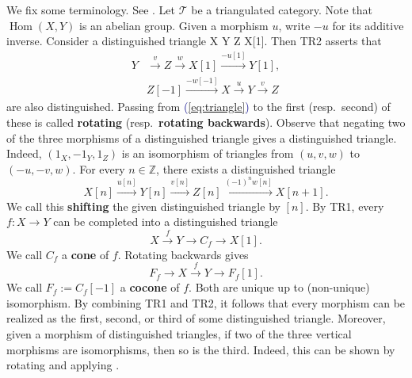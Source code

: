 \documentclass[11pt]{amsart}
\def\eqref#1{\textcolor{darkblue}{(\ref{#1})}}
\let\oldequation\equation
\let\oldendequation\endequation
\renewenvironment{equation}{\linenomathNonumbers\oldequation}{\oldendequation\endlinenomath}
\theoremstyle{plain}
\theoremstyle{definition}
\numberwithin{equation}{section}
\numberwithin{theorem}{section}
\begin{document}
We fix some terminology. 
See \cite[\S 1]{Neeman:2001}.
Let $\mathcal{T}$ be a triangulated category.
Note that $\operatorname{Hom}(X,Y)$ is an abelian group.
Given a morphism $u$, write $-u$ for its additive inverse.
Consider a distinguished triangle
\begin{equation}
    \label{eq:triangle}
    X Y Z X[1].
\end{equation}
Then TR2 asserts that
\begin{displaymath}
    \begin{aligned}
        Y
        & \xrightarrow{v} Z\xrightarrow{w} X[1]\xrightarrow{-u[1]} Y[1],
        \\& Z[-1]\xrightarrow{-w[-1]} X\xrightarrow{u} Y\xrightarrow{v} Z
    \end{aligned}
\end{displaymath}
are also distinguished.
Passing from \eqref{eq:triangle} to the first (resp.\ second) of these is called \textbf{rotating} (resp.\ \textbf{rotating backwards}).
Observe that negating two of the three morphisms of a distinguished triangle gives a distinguished triangle. 
Indeed, $(1_X,-1_Y,1_Z)$ is an isomorphism of triangles from $(u,v,w)$ to $(-u,-v,w)$.
For every $n\in \mathbb{Z}$, there exists a distinguished triangle
\begin{displaymath}
    X[n]\xrightarrow{u[n]} Y[n]\xrightarrow{v[n]} Z[n]\xrightarrow{(-1)^n w[n]} X[n+1].
\end{displaymath}
We call this \textbf{shifting} the given distinguished triangle by $[n]$.
By TR1, every $f\colon X\to Y$ can be completed into a distinguished triangle 
\begin{displaymath}
    X\xrightarrow{f} Y\to C_f\to X[1].
\end{displaymath}
We call $C_f$ a \textbf{cone} of $f$.
Rotating backwards gives
\begin{displaymath}
    F_f\to X\xrightarrow{f} Y\to F_f[1].
\end{displaymath}
We call $F_f := C_f[-1]$ a \textbf{cocone} of $f$.
Both are unique up to (non-unique) isomorphism.
By combining TR1 and TR2, it follows that every morphism can be realized as the first, second, or third of some distinguished triangle.
Moreover, given a morphism of distinguished triangles, if two of the three vertical morphisms are isomorphisms, then so is the third.
Indeed, this can be shown by rotating and applying \cite[Proposition 1.1.20]{Neeman:2001}.
\end{document}
